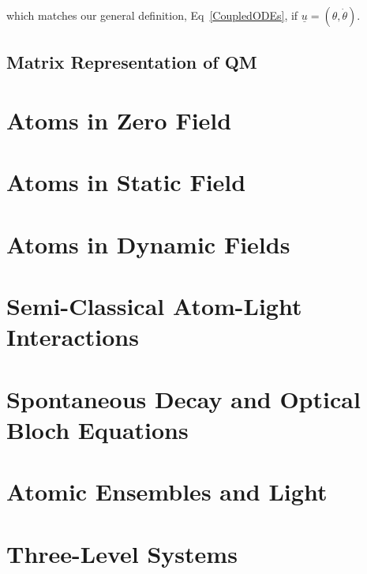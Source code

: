 \documentclass[11pt,a4paper]{article}
\begin{document}
\noindent which matches our general definition, Eq~\ref{CoupledODEs}, if $\underline{u} = (\theta, \dot{\theta})$.

\subsection{Matrix Representation of QM}

\section{Atoms in Zero Field}

\section{Atoms in Static Field}

\section{Atoms in Dynamic Fields}

\section{Semi-Classical Atom-Light Interactions}

\section{Spontaneous Decay and Optical Bloch Equations}

\section{Atomic Ensembles and Light}

\section{Three-Level Systems}




\end{document}
